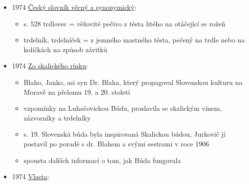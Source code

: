 \begin{itemize}
  \begin{itemize}
  \tightlist
  \item
    s. 11, článek \emph{Trdelníky}, autor GP
  \item
    trdelník je i název rožně, který se podobá trdlu na tlučení máku,
    dlouhý 25-50 cm, o průměru 5-10 cm
  \item
    v některých obcích se trdelník řiká i trubičkám se šlehačkou
  \item
    recept z Vlčnova: 

    \begin{itemize}
    \tightlist
    \item
      klasický kynutý těsto z másla, mouky, vajec, mlíka a cukru
    \item
      ale jsou dvě varianty pečení, buď plát těsta o délce těsta a šířce
      formy, nebo pásy 8 cm široké a 1 m dlouhé
    \item
      před pečením se potře tukem a vyválí v drcených ořechách s cukrem
      nebo posypátku
    \item
      peče se na bukových třískách, protože nedýmají
    \item
      při pečení se potírá mlíkem
    \end{itemize}
  \item
    v Hradčovicích  se omotával krajkou,
    bylo to asi hlavně na parádu
  \end{itemize}
\item
  1974
  \href{https://ceskadigitalniknihovna.cz/uuid/uuid:9a981180-f289-11ea-9c2e-005056827e51}{Český
  slovník věcný a synonymický}:

  \begin{itemize}
  \tightlist
  \item
    s. 528 trdlovec = věžovité pečivo z těsta litého na otáčející se
    rožeň
  \item
    trdelník, trdelníček = z jemného mastného těsta, pečený na trdle
    nebo na kolíčkách na způsob závitků
  \end{itemize}
\item
  1974
  \href{https://dikda.snk.sk/uuid/uuid:1a7c4454-d0d7-4b19-8ca8-1f1e1bda6ad7}{Zo
  skalického rínku}:

  \begin{itemize}
  \tightlist
  \item
    Blaho, Janko, asi syn Dr. Blaha, který propagoval Slovenskou kulturu
    na Moravě na přelomu 19. a 20. století
  \item
    vzpomínky na Luhačovickou Búdu, proslavila se skalickým vínem,
    zázvorníky a trdelníky
  \item
    s. 19. Slovenská búda byla inspirovaná Skalickou búdou, Jurkovič jí
    postavil po poradě s dr. Blahem a svými sestrami v roce 1906
  \item
    spousta dalších informací o tom, jak Búda fungovala
  \end{itemize}
\item
  1974
  \href{https://www.digitalniknihovna.cz/mzk/uuid/uuid:e6d72fc0-a88f-11e5-82dc-5ef3fc9bb22f}{Vlasta}:


\end{itemize}
